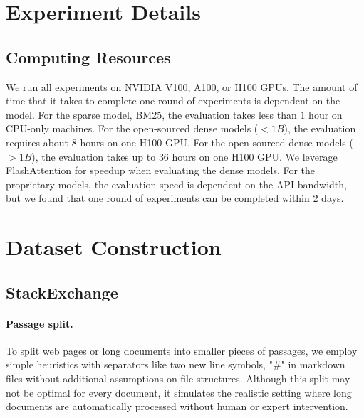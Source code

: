 \newpage
\tableofcontents
\section{Experiment Details}
\label{app:experiment_details}

\subsection{Computing Resources}
\label{app:machines}
We run all experiments on NVIDIA V100, A100, or H100 GPUs. 
The amount of time that it takes to complete one round of experiments is dependent on the model.
For the sparse model, BM25, the evaluation takes less than $1$ hour on CPU-only machines.
For the open-sourced dense models ($<1B$), the evaluation requires about $8$ hours on one H100 GPU.
For the open-sourced dense models ($>1B$), the evaluation takes up to $36$ hours on one H100 GPU.
We leverage FlashAttention \citep{dao2022flashattention,dao2023flashattention2} for speedup when evaluating the dense models.
For the proprietary models, the evaluation speed is dependent on the API bandwidth, but we found that one round of experiments can be completed within $2$ days.




% 




\section{Dataset Construction}
\subsection{StackExchange}
\label{app:stackexchange}
\paragraph{Passage split.} To split web pages or long documents into smaller pieces of passages, we employ simple heuristics with separators like two new line symbols, "\#" in markdown files without additional assumptions on file structures.
Although this split may not be optimal for every document, it simulates the realistic setting where long documents are automatically processed without human or expert intervention.

